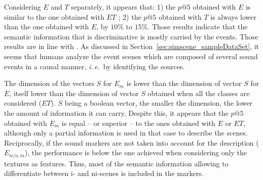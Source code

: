 \documentclass[12pt]{elsarticle}
\newcommand{\ie}{\emph{i.\,e.}}
\begin{document}
Considering $E$ and $T$ separately, it appears that: 1) the $p@5$ obtained with $E$ is similar to the one obtained with $ET$ ; 2) the $p@5$ obtained with $T$ is always lower than the one obtained with $E$, by $10\%$ to $15\%$. Those results indicate that the semantic information that is discriminative is mostly carried by the events. Those results are in line with \cite{maffiolo_caracterisation_1999}. As discussed in Section~\ref{sec:simscene_sampleDataSet}, it seems that humans analyze the event scenes which are composed of several sound events in a causal manner, \ie~by identifying the sources.


The dimension of the vectors $S$ for $E_m$ is lower than the dimension of vector $S$ for $E$, itself lower than the dimension of vector $S$ obtained when all the classes are considered ($ET$). $S$ being a boolean vector, the smaller the dimension, the lower the amount of information it can carry. Despite this, it appears that the $p@5$ obtained with $E_m$ is equal – or superior – to the ones obtained with $E$ or $ET$, although only a partial information is used in that case to describe the scenes. Reciprocally, if the sound markers are not taken into account for the description ($E_{w/o,m}$), the performance is below the one achieved when considering only the textures as features. Thus, most of the semantic information allowing to differentiate between i- and ni-scenes is included in the markers.

%
\end{document}
